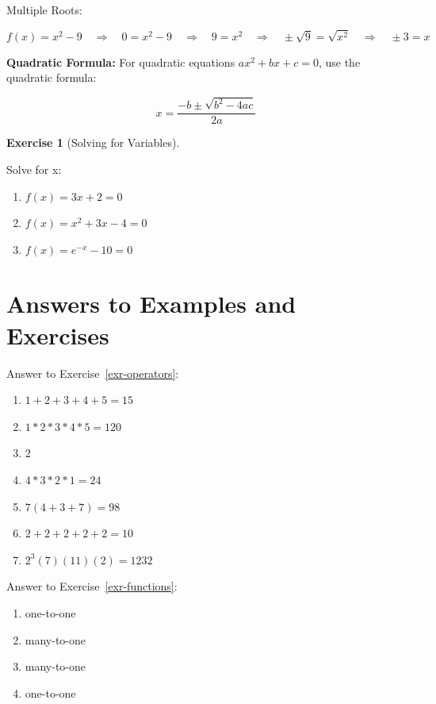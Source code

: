 \documentclass[
  letterpaper,
]{book}
\providecommand{\tightlist}{%
  \setlength{\itemsep}{0pt}\setlength{\parskip}{0pt}}\usepackage{longtable,booktabs,array}
\theoremstyle{definition}
\theoremstyle{definition}
\theoremstyle{plain}
\theoremstyle{definition}
\newtheorem{exercise}{Exercise}[chapter]
\theoremstyle{plain}
\theoremstyle{plain}
\theoremstyle{remark}
\begin{document}
Multiple Roots:

\[
f(x)=x^2 - 9 \quad\Longrightarrow\quad 0=x^2 - 9 \quad\Longrightarrow\quad 9=x^2 \quad\Longrightarrow\quad \pm \sqrt{9}=\sqrt{x^2} \quad\Longrightarrow\quad \pm 3=x
\]

\textbf{Quadratic Formula:} For quadratic equations \(ax^2+bx+c=0\), use
the quadratic formula:

\[
x=\frac{-b\pm\sqrt{b^2-4ac}}{2a}
\]

\leavevmode{}%
\begin{exercise}[Solving for Variables]\label{exr-solvevar}

Solve for x:

\begin{enumerate}
\def\labelenumi{\arabic{enumi}.}
\tightlist
\item
  \(f(x)=3x+2 = 0\)
\item
  \(f(x)=x^2+3x-4=0\)
\item
  \(f(x)=e^{-x}-10 = 0\)
\end{enumerate}

\end{exercise}

\hypertarget{answers-to-examples-and-exercises}{%
\section*{Answers to Examples and
Exercises}\label{answers-to-examples-and-exercises}}

Answer to Exercise~\ref{exr-operators}:

\begin{enumerate}
\def\labelenumi{\arabic{enumi}.}
\tightlist
\item
  \(1 + 2 + 3 + 4 + 5 = 15\)
\item
  \(1 * 2 * 3 * 4 * 5 = 120\)
\item
  \(2\)
\item
  \(4 * 3 * 2 * 1 = 24\)
\item
  \(7(4 + 3 + 7) = 98\)
\item
  \(2 + 2 + 2 + 2 + 2 = 10\)
\item
  \(2^3(7)(11)(2) = 1232\)
\end{enumerate}

Answer to Exercise~\ref{exr-functions}:

\begin{enumerate}
\def\labelenumi{\arabic{enumi}.}
\tightlist
\item
  one-to-one
\item
  many-to-one
\item
  many-to-one
\item
  one-to-one
\end{enumerate}
\end{document}

